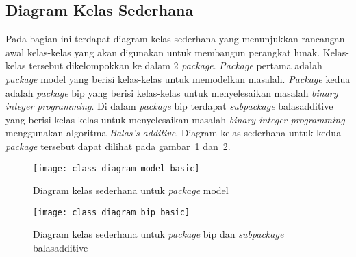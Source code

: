 \subsection{Diagram Kelas Sederhana}
\label{subsec:diagram_kelas_sederhana}
Pada bagian ini terdapat diagram kelas sederhana yang menunjukkan rancangan awal kelas-kelas yang akan digunakan untuk membangun perangkat lunak. Kelas-kelas tersebut dikelompokkan ke dalam 2 \textit{package}. \textit{Package} pertama adalah \textit{package} model yang berisi kelas-kelas untuk memodelkan masalah. \textit{Package} kedua adalah \textit{package} bip yang berisi kelas-kelas untuk menyelesaikan masalah \textit{binary integer programming}. Di dalam \textit{package} bip terdapat \textit{subpackage} balasadditive yang berisi kelas-kelas untuk menyelesaikan masalah \textit{binary integer programming} menggunakan algoritma \textit{Balas's additive}. Diagram kelas sederhana untuk kedua \textit{package} tersebut dapat dilihat pada gambar~\ref{fig:class_diagram_model_basic} dan~\ref{fig:class_diagram_bip_basic}.

\begin{figure}[h]
	\centering  
	\texttt{[image: class\_diagram\_model\_basic]}
	\caption[Diagram kelas sederhana untuk \textit{package} model]{Diagram kelas sederhana untuk \textit{package} model}
	\label{fig:class_diagram_model_basic}
\end{figure}

\begin{figure}[h]
	\centering  
	\texttt{[image: class\_diagram\_bip\_basic]}
	\caption[Diagram kelas sederhana untuk \textit{package} bip dan \textit{subpackage} balasadditive]{Diagram kelas sederhana untuk \textit{package} bip dan \textit{subpackage} balasadditive}
	\label{fig:class_diagram_bip_basic}
\end{figure}